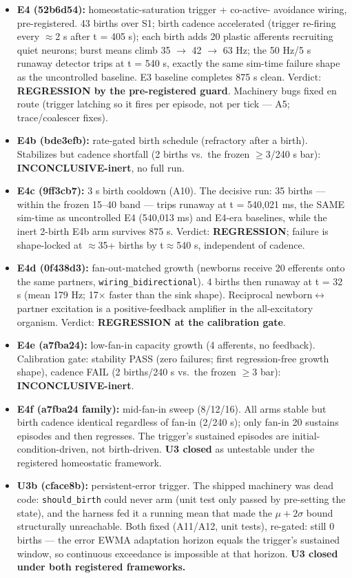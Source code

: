 \begin{itemize}
\item \textbf{E4 (52b6d54):} homeostatic-saturation trigger + co-active-
avoidance wiring, pre-registered. 43 births over S1; birth cadence
accelerated (trigger re-firing every \(\approx\)2 s after t = 405 s);
each birth adds 20 plastic afferents recruiting quiet neurons; burst
means climb 35 \(\to\) 42 \(\to\) 63 Hz; the 50 Hz/5 s runaway
detector trips at t = 540 s, exactly the same sim-time failure shape
as the uncontrolled baseline. E3 baseline completes 875 s clean.
Verdict: \textbf{REGRESSION by the pre-registered guard}. Machinery
bugs fixed en route (trigger latching so it fires per episode, not per
tick --- A5; trace/coalescer fixes).
\item \textbf{E4b (bde3efb):} rate-gated birth schedule (refractory
after a birth). Stabilizes but cadence shortfall (2 births vs.\ the
frozen \(\ge 3\)/240 s bar): \textbf{INCONCLUSIVE-inert}, no full run.
\item \textbf{E4c (9ff3cb7):} 3 s birth cooldown (A10). The decisive
run: 35 births --- within the frozen 15--40 band --- trips runaway at
t = 540{,}021 ms, the SAME sim-time as uncontrolled E4 (540{,}013 ms)
and E4-era baselines, while the inert 2-birth E4b arm survives 875 s.
Verdict: \textbf{REGRESSION}; failure is shape-locked at
\(\approx\)35+ births by t\(\approx\)540 s, independent of cadence.
\item \textbf{E4d (0f438d3):} fan-out-matched growth (newborns receive
20 efferents onto the same partners, \texttt{wiring\_bidirectional}).
4 births then runaway at t = 32 s (mean 179 Hz; 17\(\times\) faster
than the sink shape). Reciprocal newborn\(\leftrightarrow\)partner
excitation is a positive-feedback amplifier in the all-excitatory
organism. Verdict: \textbf{REGRESSION at the calibration gate}.
\item \textbf{E4e (a7fba24):} low-fan-in capacity growth (4 afferents,
no feedback). Calibration gate: stability PASS (zero failures; first
regression-free growth shape), cadence FAIL (2 births/240 s vs.\ the
frozen \(\ge 3\) bar): \textbf{INCONCLUSIVE-inert}.
\item \textbf{E4f (a7fba24 family):} mid-fan-in sweep (8/12/16).
All arms stable but birth cadence identical regardless of fan-in
(2/240 s); only fan-in 20 sustains episodes and then regresses. The
trigger's sustained episodes are initial-condition-driven, not
birth-driven. \textbf{U3 closed} as untestable under the registered
homeostatic framework.
\item \textbf{U3b (cface8b):} persistent-error trigger. The shipped
machinery was dead code: \texttt{should\_birth} could never arm (unit
test only passed by pre-setting the state), and the harness fed it a
running mean that made the \(\mu+2\sigma\) bound structurally
unreachable. Both fixed (A11/A12, unit tests), re-gated: still
0 births --- the error EWMA adaptation horizon equals the trigger's
sustained window, so continuous exceedance is impossible at that
horizon. \textbf{U3 closed under both registered frameworks.}
\end{itemize}

